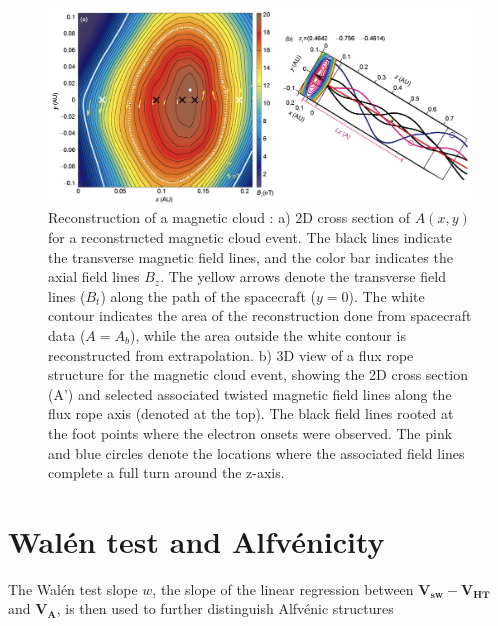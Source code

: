 \begin{figure}
    \centering
    \includegraphics[width=\textwidth]{Figures/Reconstructions/Hu2015_GSreconstruction.png}
    \caption[GS 2D reconstruction of a magnetic cloud]{Reconstruction of a magnetic cloud \citep{Hu:2015}: a) 2D cross section of $A(x,y)$ for a reconstructed magnetic cloud event. The black lines indicate the transverse magnetic field lines, and the color bar indicates the axial field lines $B_z$. The yellow arrows denote the transverse field lines ($B_t$) along the path of the spacecraft ($y=0$). The white contour indicates the area of the reconstruction done from spacecraft data ($A=A_b$), while the area outside the white contour is reconstructed from extrapolation. b) 3D view of a flux rope structure for the magnetic cloud event, showing the 2D cross section (A') and selected associated twisted magnetic field lines along the flux rope axis (denoted at the top). The black field lines  rooted at the foot points where the electron onsets were observed. The pink and blue circles denote the locations where the associated field lines complete a full turn around the z-axis.}
    \label{fig:GSreconstruction_Hu2015}
\end{figure}


\section{Wal\'en test and Alfv\'enicity}
The Wal\'en test slope $w$, the slope of the linear regression between $\mathbf{V_{sw}} - \mathbf{V_{HT}}$ and $\mathbf{V_A}$, is then used to further distinguish Alfv\'enic structures

